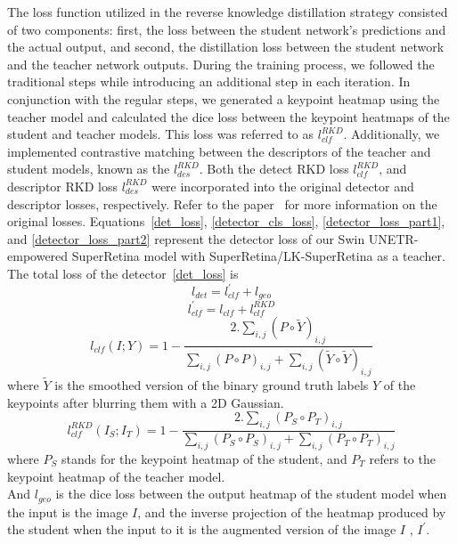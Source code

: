 \documentclass[10pt,twocolumn,letterpaper]{article}
\begin{document}
The loss function utilized in the reverse knowledge distillation strategy consisted of two components: first, the loss between the student network's predictions and the actual output, and second, the distillation loss between the student network and the teacher network outputs. During the training process, we followed the traditional steps while introducing an additional step in each iteration. In conjunction with the regular steps, we generated a keypoint heatmap using the teacher model and calculated the dice loss between the keypoint heatmaps of the student and teacher models. This loss was referred to as $l_{clf}^{RKD}$. Additionally, we implemented contrastive matching between the descriptors of the teacher and student models, known as the $l_{des}^{RKD}$. Both the detect RKD loss $l_{clf}^{RKD}$, and descriptor RKD loss $l_{des}^{RKD}$ were incorporated into the original detector and descriptor losses, respectively. Refer to the paper~\cite{liu2022semi} for more information on the original losses.
Equations~\ref{det_loss}, \ref{detector_cls_loss}, \ref{detector_loss_part1}, and \ref{detector_loss_part2} represent the detector loss of our Swin UNETR-empowered SuperRetina model with SuperRetina/LK-SuperRetina as a teacher.
The total loss of the detector~\ref{det_loss} is
\begin{equation}\label{det_loss}
    l_{det} = l_{clf}^{'} + l_{geo}
\end{equation}
\begin{equation}\label{detector_cls_loss}
    l_{clf}^{'} = l_{clf} + l_{clf}^{RKD} 
\end{equation}
\begin{equation}\label{detector_loss_part1}
    l_{clf}(I;Y) = 1-\frac{2. \sum_{i,j}(P\circ \tilde{Y})_{i,j}}{\sum_{i,j}(P \circ P)_{i,j}+\sum_{i,j}(\tilde{Y}\circ \tilde{Y})_{i,j}} 
\end{equation}
where $\tilde{Y}$ is the smoothed version of the binary ground truth labels $Y$ of the keypoints after blurring them with a 2D Gaussian.
\begin{equation}\label{detector_loss_part2}
    l_{clf}^{RKD}(I_S;I_T) = 1-\frac{2. \sum_{i,j}(P_S\circ P_T)_{i,j}}{\sum_{i,j}(P_S \circ P_S)_{i,j}+\sum_{i,j}(P_T\circ P_T)_{i,j}} 
\end{equation}
where $P_S$ stands for the keypoint heatmap of the student, and $P_T$ refers to the keypoint heatmap of the teacher model.\\ 
And $ l_{geo} $ is the dice loss between the output heatmap of the student model when the input is the image $ I $, and the inverse projection of the heatmap produced by the student when the input to it is the augmented version of the image $ I $ , $ I^{'} $.
\end{document}
